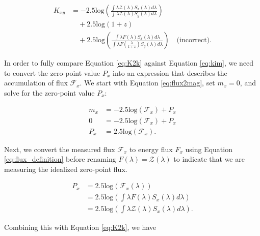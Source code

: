 \begin{equation}
\begin{aligned}
\label{eq:kim}
  K_{xy} &=
    -2.5\text{log} \left(
      \frac{\int \lambda \mathcal{Z}(\lambda)S_x(\lambda)d\lambda}
           {\int \lambda \mathcal{Z}(\lambda)S_y(\lambda)d\lambda}\right) \\
    &\quad + 2.5\text{log}(1+z) \\
    &\quad + 2.5\text{log}\left(
      \frac{\int \lambda F(\lambda)S_x(\lambda)d\lambda}
           {\int \lambda F\left(\frac{\lambda}{1+z}\right)S_y(\lambda)d\lambda}\right) \quad \text{(incorrect)}.
\end{aligned}
\end{equation}

In order to fully compare Equation \ref{eq:K2k} against Equation \ref{eq:kim},
we need to convert the zero-point value $P_x$ into an expression that describes
the accumulation of flux $\mathcal{F}_x$. We start with
Equation \ref{eq:flux2mag}, set ${m_x = 0}$, and solve for the zero-point value
$P_x$:

\begin{equation}
\begin{aligned}
  m_x &= -2.5 \text{log}(\mathcal{F}_x) + P_x \\
    0 &= -2.5 \text{log}(\mathcal{F}_x) + P_x \\
  P_x &= 2.5 \text{log}(\mathcal{F}_x).
\end{aligned}
\end{equation}

\noindent Next, we convert the measured flux $\mathcal{F}_x$ to energy flux
$F_x$ using Equation \ref{eq:flux_definition} before renaming
$F(\lambda) = \mathcal{Z}(\lambda)$ to indicate that we are measuring the
idealized zero-point flux.

\begin{equation}
\begin{aligned}
  P_x &= 2.5 \text{log}(\mathcal{F}_x(\lambda)) \\
      &= 2.5 \text{log}\left( \int \lambda F(\lambda) S_x(\lambda) d\lambda \right) \\
      &= 2.5 \text{log}\left( \int \lambda \mathcal{Z}(\lambda) S_x(\lambda) d\lambda \right).
\end{aligned}
\end{equation}


\noindent Combining this with Equation \ref{eq:K2k}, we have

